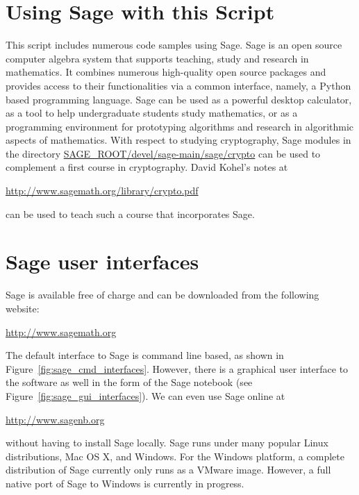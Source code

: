 \newpage
\hypertarget{appendix-using-sage}{}
\section{Using Sage with this Script}
\label{s:appendix-using-sage}

This script includes numerous code samples using Sage. Sage is an open
source computer algebra system that supports teaching, study and
research in mathematics.  It combines numerous high-quality open
source packages and provides access to their functionalities via a
common interface, namely, a Python based programming language.  Sage
can be used as a powerful desktop calculator, as a tool to help
undergraduate students study mathematics, or as a programming
environment for prototyping algorithms and research in algorithmic
aspects of mathematics.  With respect to studying cryptography, Sage
modules in the directory  \url{SAGE_ROOT/devel/sage-main/sage/crypto}
can be used to complement a first course in cryptography.  David
Kohel's notes at
\begin{center}
  \url{http://www.sagemath.org/library/crypto.pdf}
\end{center}
can be used to teach such a course that incorporates Sage.


\section*{Sage user interfaces}

Sage is available free of charge and can be downloaded from the
following website:
\begin{center}
  \url{http://www.sagemath.org} \\
\end{center}
The default interface to Sage is command line based, as shown in
Figure~\ref{fig:sage_cmd_interfaces}. However, there is a
graphical user interface to the software as well in the form of the
Sage notebook (see Figure~\ref{fig:sage_gui_interfaces}). We can even
use Sage online at
\begin{center}
\url{http://www.sagenb.org}
\end{center}
without having to install Sage locally. Sage runs under many popular
Linux distributions, Mac OS X, and Windows. For the Windows platform,
a complete distribution of Sage currently only runs as a VMware
image. However, a full native port of Sage to Windows is currently in
progress.

